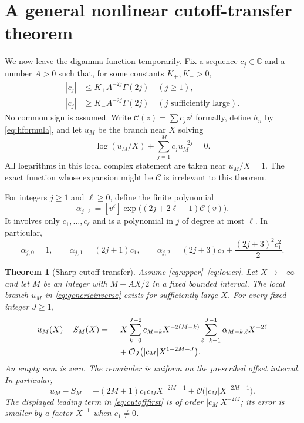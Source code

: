 \documentclass[11pt,a4paper]{article}
\newtheorem{theorem}{Theorem}[section]
\theoremstyle{definition}
\numberwithin{equation}{section}
\newcommand{\C}{\mathbb C}
\newcommand{\Oh}{\mathcal O}
\newcommand{\cF}{\mathcal C}
\newcommand{\coef}[2]{[#1^{#2}]}
\begin{document}
\section{A general nonlinear cutoff-transfer theorem}
\label{sec:cutoff}

We now leave the digamma function temporarily. Fix a sequence $c_j\in\C$ and a number $A>0$ such that, for some constants $K_+,K_->0$,
\begin{align}
 |c_j|&\le K_+ A^{-2j}\Gamma(2j)\quad(j\ge1),\label{eq:upper}\\
 |c_j|&\ge K_- A^{-2j}\Gamma(2j)\quad(j\text{ sufficiently large}).
 \label{eq:lower}
\end{align}
No common sign is assumed. Write $\cF(z)=\sum c_jz^j$ formally, define $h_n$ by \eqref{eq:hformula}, and let $u_M$ be the branch near $X$ solving
\begin{equation}
 \log(u_M/X)+\sum_{j=1}^M c_ju_M^{-2j}=0.
 \label{eq:genericinverse}
\end{equation}
All logarithms in this local complex statement are taken near $u_M/X=1$. The exact function whose expansion might be $\cF$ is irrelevant to this theorem.

For integers $j\ge1$ and $\ell\ge0$, define the finite polynomial
\begin{equation}
 \alpha_{j,\ell}=
 \coef{v}{\ell}\exp\bigl((2j+2\ell-1)\cF(v)\bigr).
 \label{eq:alpha}
\end{equation}
It involves only $c_1,\ldots,c_\ell$ and is a polynomial in $j$ of degree at most $\ell$. In particular,
\begin{equation}
 \alpha_{j,0}=1,\qquad
 \alpha_{j,1}=(2j+1)c_1,\qquad
 \alpha_{j,2}=(2j+3)c_2+\frac{(2j+3)^2c_1^2}{2}.
 \label{eq:alphafirst}
\end{equation}

\begin{theorem}[Sharp cutoff transfer]
\label{thm:cutoff}
Assume \eqref{eq:upper}--\eqref{eq:lower}. Let $X\to+\infty$ and let $M$ be an integer with $M-AX/2$ in a fixed bounded interval. The local branch $u_M$ in \eqref{eq:genericinverse} exists for sufficiently large $X$. For every fixed integer $J\ge1$,
\begin{align}
 u_M(X)-S_M(X)
 ={}&-X\sum_{k=0}^{J-2}c_{M-k}X^{-2(M-k)}
       \sum_{\ell=k+1}^{J-1}\alpha_{M-k,\ell}X^{-2\ell}
 \notag\\
 &\quad+\Oh_J\bigl(|c_M|X^{1-2M-J}\bigr).
 \label{eq:diagonal}
\end{align}
An empty sum is zero. The remainder is uniform on the prescribed offset interval. In particular,
\begin{equation}
 u_M-S_M=-(2M+1)c_1c_MX^{-2M-1}
             +\Oh\bigl(|c_M|X^{-2M-1}\bigr).
 \label{eq:cutofffirst}
\end{equation}
The displayed leading term in \eqref{eq:cutofffirst} is of order
$|c_M|X^{-2M}$; its error is smaller by a factor $X^{-1}$ when $c_1\ne0$.
\end{theorem}
\end{document}
